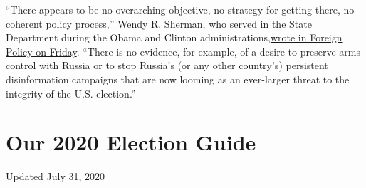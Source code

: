 ``There appears to be no overarching objective, no strategy for getting
there, no coherent policy process,'' Wendy R. Sherman, who served in the
State Department during the Obama and Clinton
administrations,\href{https://foreignpolicy.com/2020/07/31/trump-destruction-foreign-policy/}{wrote
in Foreign Policy on Friday}. ``There is no evidence, for example, of a
desire to preserve arms control with Russia or to stop Russia's (or any
other country's) persistent disinformation campaigns that are now
looming as an ever-larger threat to the integrity of the U.S.
election.''

\hypertarget{our-2020-election-guide}{%
\section{Our 2020 Election Guide}\label{our-2020-election-guide}}

Updated July 31, 2020

